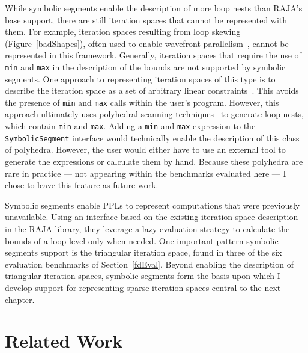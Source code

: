 While symbolic segments enable the description of more loop nests than RAJA's base support, there are still iteration spaces that cannot be represented with them.
For example, iteration spaces resulting from loop skewing (Figure~\ref{badShapes}), often used to enable wavefront parallelism~\cite{wolf1991loop}, cannot be represented in this framework. 
Generally, iteration spaces that require the use of \verb.min. and \verb.max. in the description of the bounds are not supported by symbolic segments.
One approach to representing iteration spaces of this type is to describe the iteration space as a set of arbitrary linear constraints~\cite{verdoolaege2012polyhedral}.
This avoids the presence of \verb.min. and \verb.max. calls within the user's program.
However, this approach ultimately uses polyhedral scanning techniques~\cite{pouchet2007iterative,grosser2011polly, benabderrahmane2010polyhedral} to generate loop nests, which contain \verb.min. and \verb.max..
Adding a \verb.min. and \verb.max. expression to the \verb.SymbolicSegment. interface would technically enable the description of this class of polyhedra.
However, the user would either have to use an external tool to generate the expressions or calculate them by hand.
Because these polyhedra are rare in practice --- not appearing within the benchmarks evaluated here --- I chose to leave this feature as future work.

Symbolic segments enable PPLs to represent computations that were previously unavailable.
Using an interface based on the existing iteration space description in the RAJA library, they leverage a lazy evaluation strategy to calculate the bounds of a loop level only when needed.
One important pattern symbolic segments support is the triangular iteration space, found in three of the six evaluation benchmarks of Section~\ref{fdEval}.
Beyond enabling the description of triangular iteration spaces, symbolic segments form the basis upon which I develop support for representing sparse iteration spaces central to the next chapter.

\section{Related Work}

